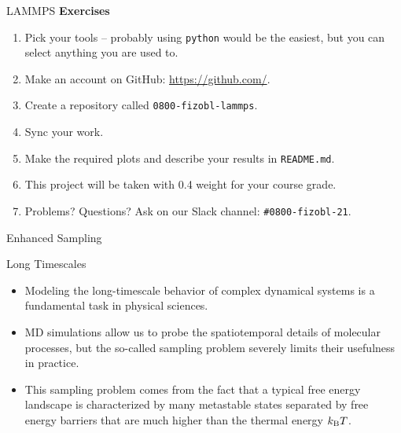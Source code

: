\documentclass[10pt]{beamer}
\begin{document}
\begin{frame}{LAMMPS}
  \textbf{Exercises}\\[0.2cm]
  \begin{enumerate}
    \setlength\itemsep{1em}
    \item Pick your tools -- probably using \texttt{python} would be the easiest, but you can select anything you are used to.

    \item Make an account on GitHub: \url{https://github.com/}.

    \item Create a repository called \texttt{0800-fizobl-lammps}.

    \item Sync your work.

    \item Make the required plots and describe your results in \texttt{README.md}.

    \item This project will be taken with 0.4 weight for your course grade.

    \item Problems? Questions? Ask on our Slack channel: \texttt{\#0800-fizobl-21}.
  \end{enumerate}
\end{frame}

\begin{frame}{}
  \begin{center}
    \fontsize{25pt}{6}\selectfont\vspace{1.2cm}
    \textcolor{subtitle}{Enhanced Sampling}
  \end{center}
\end{frame}

\begin{frame}{Long Timescales}
\begin{itemize}
\setlength\itemsep{1em}
  \item Modeling the long-timescale behavior of complex dynamical systems is a fundamental task in physical sciences.

  \item MD simulations allow us to probe the spatiotemporal details of molecular processes, but the so-called sampling problem severely limits their usefulness in practice.

  \item This sampling problem comes from the fact that a typical free energy landscape is characterized by many metastable states separated by free energy barriers that are much higher than the thermal energy $k_\mathrm{B}T$.
\end{itemize}
\end{frame}
\end{document}
